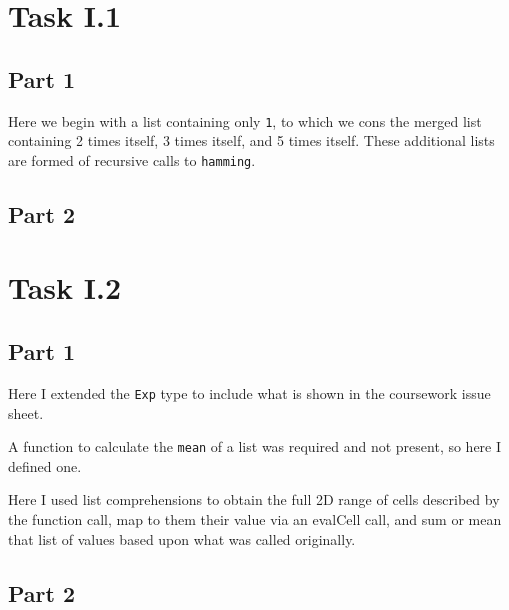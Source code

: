 \documentclass[11pt]{article}
\begin{document}
\maketitle
\tableofcontents
\pagebreak

\section{Task I.1}

\subsection{Part 1}


Here we begin with a list containing only \verb|1|, to which we cons the merged list containing 2 times itself, 3 times itself, and 5 times itself.
These additional lists are formed of recursive calls to \verb|hamming|.

\subsection{Part 2}

\section{Task I.2}

\subsection{Part 1}


Here I extended the \verb|Exp| type to include what is shown in the coursework issue sheet.



A function to calculate the \verb|mean| of a list was required and not present, so here I defined one.



Here I used list comprehensions to obtain the full 2D range of cells described by the function call, map to them their value via an evalCell call, and sum or mean that list of values based upon what was called originally.

\subsection{Part 2}
\end{document}

